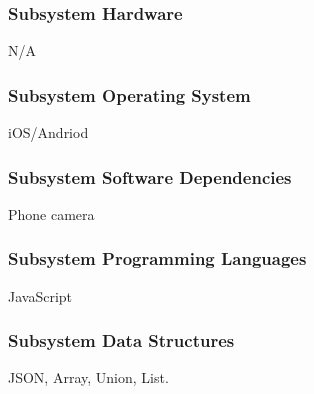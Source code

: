 \subsubsection{Subsystem Hardware}
N/A

\subsubsection{Subsystem Operating System}
iOS/Andriod

\subsubsection{Subsystem Software Dependencies}
Phone camera

\subsubsection{Subsystem Programming Languages}
JavaScript

\subsubsection{Subsystem Data Structures}
JSON, Array, Union, List.
